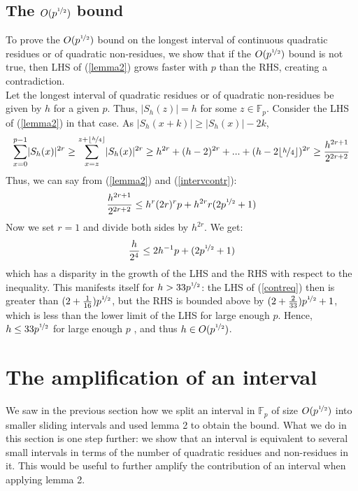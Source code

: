 \documentclass{report}
\begin{document}
\subsection*{The $O(p^{\nicefrac{1}{2}})$ bound}
To prove the $O(p^{\nicefrac{1}{2}})$ bound on the longest interval of continuous quadratic residues or of quadratic non-residues, we show that if the $O(p^{\nicefrac{1}{2}})$ bound is not true, then LHS of (\ref{lemma2}) grows faster with $p$ than the RHS, creating a contradiction.\\
Let the longest interval of quadratic residues or of quadratic non-residues be given by $h$ for a given $p$. Thus, $\lvert S_h(z)\rvert=h$ for some $z\in \mathbb{F}_p$. Consider the LHS of (\ref{lemma2}) in that case. As $\lvert S_h(x+k)\rvert \geq \lvert S_h(x)\rvert-2k$,
\begin{equation} \label{intervcontr}
\sum\limits_{x=0}^{p-1}\lvert S_h(x)\rvert^{2r}\geq\sum\limits_{x=z}^{z+\lfloor\nicefrac{h}{4}\rfloor}\lvert S_h(x)\rvert^{2r} \geq h^{2r}+(h-2)^{2r}+...+(h-2\lfloor\nicefrac{h}{4}\rfloor)^{2r} \geq \frac{h^{2r+1}}{2^{2r+2}}
\end{equation}
Thus, we can say from (\ref{lemma2}) and (\ref{intervcontr}):
$$ \frac{h^{2r+1}}{2^{2r+2}} \leq h^{r}(2r)^{r}p+h^{2r}r(2p^{\nicefrac{1}{2}}+1)$$
Now we set $r=1$ and divide both sides by $h^{2r}$. We get:
\begin{equation} \label{contreq}
\frac{h}{2^{4}} \leq 2h^{-1}p+(2p^{\nicefrac{1}{2}}+1)
\end{equation}
which has a disparity in the growth of the LHS and the RHS with respect to the inequality. This manifests itself for $h>33p^{\nicefrac{1}{2}}$: the LHS of (\ref{contreq}) then is greater than $(2+\frac{1}{16})p^{\nicefrac{1}{2}}$, but the RHS is bounded above by $(2+\frac{2}{33})p^{\nicefrac{1}{2}}+1$, which is less than the lower limit of the LHS for large enough $p$. Hence, $h\leq 33p^{\nicefrac{1}{2}}$ for large enough $p$ , and thus $h\in O(p^{\nicefrac{1}{2}})$.
%
%
\section{The amplification of an interval}
We saw in the previous section how we split an interval in $\mathbb{F}_p$ of size $O(p^{\nicefrac{1}{2}})$ into smaller sliding intervals and used lemma 2 to obtain the bound. What we do in this section is one step further: we show that an interval is equivalent to several small intervals in terms of the number of quadratic residues and non-residues in it. This would be useful to further amplify the contribution of an interval when applying lemma 2.
\end{document}
